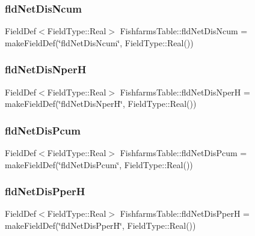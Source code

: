 \mbox{\label{class_fishfarms_table_a8c58079b7605719ac5a0877222681163}} 
\subsubsection{\texorpdfstring{fldNetDisNcum}{fldNetDisNcum}}
{\footnotesize\ttfamily Field\+Def$<$Field\+Type\+::\+Real$>$ Fishfarms\+Table\+::fld\+Net\+Dis\+Ncum = make\+Field\+Def(\char`\"{}fld\+Net\+Dis\+Ncum\char`\"{}, Field\+Type\+::\+Real())}

\mbox{\label{class_fishfarms_table_ae892ef91c5435a0184f8b15078831764}} 
\subsubsection{\texorpdfstring{fldNetDisNperH}{fldNetDisNperH}}
{\footnotesize\ttfamily Field\+Def$<$Field\+Type\+::\+Real$>$ Fishfarms\+Table\+::fld\+Net\+Dis\+NperH = make\+Field\+Def(\char`\"{}fld\+Net\+Dis\+NperH\char`\"{}, Field\+Type\+::\+Real())}

\mbox{\label{class_fishfarms_table_aa5a26112e4b750c58e61821f6cac2653}} 
\subsubsection{\texorpdfstring{fldNetDisPcum}{fldNetDisPcum}}
{\footnotesize\ttfamily Field\+Def$<$Field\+Type\+::\+Real$>$ Fishfarms\+Table\+::fld\+Net\+Dis\+Pcum = make\+Field\+Def(\char`\"{}fld\+Net\+Dis\+Pcum\char`\"{}, Field\+Type\+::\+Real())}

\mbox{\label{class_fishfarms_table_a4b6f22df6eafb3566834d5af83398330}} 
\subsubsection{\texorpdfstring{fldNetDisPperH}{fldNetDisPperH}}
{\footnotesize\ttfamily Field\+Def$<$Field\+Type\+::\+Real$>$ Fishfarms\+Table\+::fld\+Net\+Dis\+PperH = make\+Field\+Def(\char`\"{}fld\+Net\+Dis\+PperH\char`\"{}, Field\+Type\+::\+Real())}

